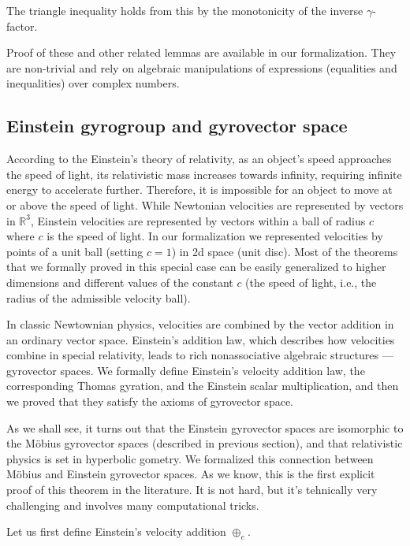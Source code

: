 \documentclass[a4paper]{article}
\theoremstyle{definition}
\begin{document}
\noindent The triangle inequality holds from this by the monotonicity
of the inverse $\gamma$-factor.

Proof of these and other related lemmas are available in our
formalization. They are non-trivial and rely on algebraic
manipulations of expressions (equalities and inequalities) over
complex numbers.

\subsection{Einstein gyrogroup and gyrovector space}
\label{einstein_gvs}
  
According to the Einstein's theory of relativity, as an object's speed
approaches the speed of light, its relativistic mass increases towards
infinity, requiring infinite energy to accelerate further. Therefore,
it is impossible for an object to move at or above the speed of
light. While Newtonian velocities are represented by vectors in
$\mathbb{R}^3$, Einstein velocities are represented by vectors within
a ball of radius $c$ where $c$ is the speed of light. In our
formalization we represented velocities by points of a unit ball
(setting $c=1$) in 2d space (unit disc). Most of the theorems that we
formally proved in this special case can be easily generalized to
higher dimensions and different values of the constant $c$ (the speed
of light, i.e., the radius of the admissible velocity ball).

In classic Newtownian physics, velocities are combined by the vector
addition in an ordinary vector space. Einstein's addition law, which
describes how velocities combine in special relativity, leads to rich
nonassociative algebraic structures --- gyrovector spaces. We formally
define Einstein's velocity addition law, the corresponding Thomas
gyration, and the Einstein scalar multiplication, and then we proved
that they satisfy the axioms of gyrovector space.

As we shall see, it turns out that the Einstein gyrovector spaces are
isomorphic to the M\" obius gyrovector spaces (described in previous
section), and that relativistic physics is set in hyperbolic
gometry. We formalized this connection between M\" obius and Einstein
gyrovector spaces. As we know, this is the first explicit proof of
this theorem in the literature. It is not hard, but it's tehnically
very challenging and involves many computational tricks.

Let us first define Einstein's velocity addition $\oplus_e$.
\end{document}

